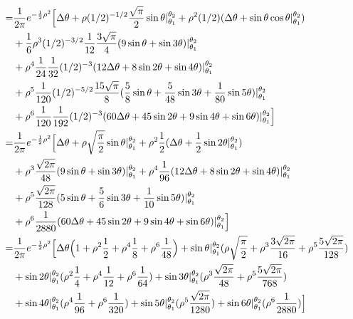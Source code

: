 \documentclass[12pt]{article}
\begin{document}
	\begin{align}
	=& \frac{1}{2\pi}e^{-\frac{1}{2}\rho^2}
		\Big[
		\Delta\theta + \rho(1/2)^{-1/2}\frac{\sqrt{\pi}}{2}\sin\theta|_{\theta_1}^{\theta_2} + \rho^2(1/2)(\Delta\theta + \sin\theta\cos\theta|_{\theta_1}^{\theta_2}) \\ \notag &+ \frac{1}{6}\rho^3(1/2)^{-3/2}\frac{1}{12}\frac{3\sqrt{\pi}}{4}(9\sin\theta+\sin3\theta)|_{\theta_1}^{\theta_2} \\ \notag &+ \rho^4\frac{1}{24}\frac{1}{32}(1/2)^{-3}(12\Delta\theta+8\sin2\theta+\sin4\theta)|_{\theta_1}^{\theta_2} \\ \notag &+ \rho^5\frac{1}{120}(1/2)^{-5/2}\frac{15\sqrt{\pi}}{8}(\frac{5}{8}\sin\theta + \frac{5}{48}\sin3\theta + \frac{1}{80}\sin5\theta)|_{\theta_1}^{\theta_2} \\ \notag &+ \rho^6\frac{1}{120}\frac{1}{192}(1/2)^{-3}(60\Delta\theta + 45\sin2\theta + 9\sin4\theta + \sin6\theta)|_{\theta_1}^{\theta_2}
		\Big] \\
	=& \frac{1}{2\pi}e^{-\frac{1}{2}\rho^2}
		\Big[
		\Delta\theta + \rho\sqrt{\frac{\pi}{2}}\sin\theta|_{\theta_1}^{\theta_2} + \rho^2\frac{1}{2}(\Delta\theta + \frac{1}{2}\sin2\theta|_{\theta_1}^{\theta_2}) \\ \notag &+ \rho^3\frac{\sqrt{2\pi}}{48}(9\sin\theta+\sin3\theta)|_{\theta_1}^{\theta_2} + \rho^4\frac{1}{96}(12\Delta\theta+8\sin2\theta+\sin4\theta)|_{\theta_1}^{\theta_2} \\ \notag &+ \rho^5\frac{\sqrt{2\pi}}{128}(5\sin\theta + \frac{5}{6}\sin3\theta + \frac{1}{10}\sin5\theta)|_{\theta_1}^{\theta_2} \\ \notag &+ \rho^6\frac{1}{2880}(60\Delta\theta + 45\sin2\theta + 9\sin4\theta + \sin6\theta)|_{\theta_1}^{\theta_2}
		\Big] \\
	=& \frac{1}{2\pi}e^{-\frac{1}{2}\rho^2}
		\Big[
		\Delta\theta\Big(1+ \rho^2\frac{1}{2} + \rho^4\frac{1}{8} + \rho^6\frac{1}{48}\Big) + \sin\theta|_{\theta_1}^{\theta_2}(\rho\sqrt{\frac{\pi}{2}} + \rho^3\frac{3\sqrt{2\pi}}{16} + \rho^5\frac{5\sqrt{2\pi}}{128}) \\ \notag &+ \sin2\theta|_{\theta_1}^{\theta_2}(\rho^2\frac{1}{4} + \rho^4\frac{1}{12} + \rho^6\frac{1}{64}) + \sin3\theta|_{\theta_1}^{\theta_2}(\rho^3\frac{\sqrt{2\pi}}{48} + \rho^5\frac{5\sqrt{2\pi}}{768}) \\ \notag &+ \sin4\theta|_{\theta_1}^{\theta_2}(\rho^4\frac{1}{96} + \rho^6\frac{1}{320}) + \sin5\theta|_{\theta_1}^{\theta_2}(\rho^5\frac{\sqrt{2\pi}}{1280}) + \sin6\theta|_{\theta_1}^{\theta_2}(\rho^6\frac{1}{2880})
		\Big]
	\end{align}
\end{document}
